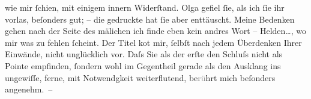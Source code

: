                  {\pb}wie mir ſchien, mit einigem innern
               Widerſtand. Olga gefiel ſie, als ich ſie ihr
               vorlas, beſonders gut; – die gedruckte hat ſie aber enttäuscht. Meine Bedenken gehen
               nach der Seite des mä\textcolor{gray}{{\geminationn}}lichen {\dotstwo} ich f\textcolor{gray}{i}nde eben kein
               andres Wort – Helden{\dots}, wo mir was zu fehlen ſcheint. Der
               Titel ko{\geminationm}t mir, ſelbſt nach jedem Überdenken Ihrer
               Einwände, nicht un{\pb}glücklich vor. Daſs Sie
               als der erſte den Schluſs nicht als Pointe empfinden, ſondern wohl im Gegentheil
               gerade als den Ausklang ins ungewiſſe, ferne, mit Notwendgkeit weiterflutend,
                  be\textcolor{gray}{rü}hrt mich beſonders angenehm. –\pend
           
